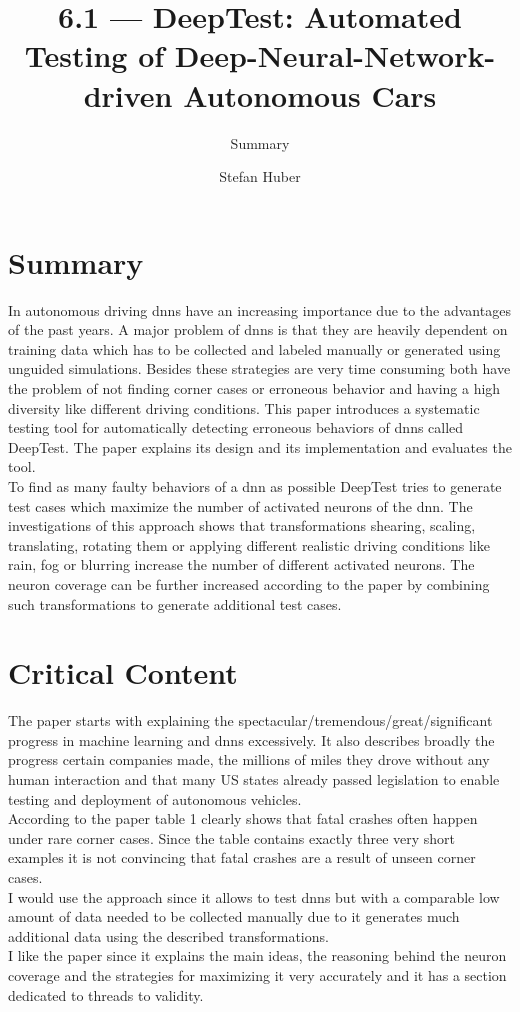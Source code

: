\documentclass[oneside, notitlepage, twocolumn]{scrartcl}
\title{\LARGE 6.1 --- DeepTest: Automated Testing of Deep-Neural-Network-driven Autonomous Cars}
\subtitle{Summary}
\author{Stefan Huber}
\begin{document}
\maketitle

\section{Summary}
In autonomous driving \glspl{dnn} have an increasing importance due to the advantages of the past years.
A major problem of \glspl{dnn} is that they are heavily dependent on training data which has to be collected and labeled manually or generated using unguided simulations.
Besides these strategies are very time consuming both have the problem of not finding corner cases or erroneous behavior and having a high diversity like different driving conditions.
This paper introduces a systematic testing tool for automatically detecting erroneous behaviors of \glspl{dnn} called DeepTest.
The paper explains its design and its implementation and evaluates the tool.\\
To find as many faulty behaviors of a \gls{dnn} as possible DeepTest tries to generate test cases which maximize the number of activated neurons of the \gls{dnn}.
The investigations of this approach shows that transformations shearing, scaling, translating, rotating them or applying different realistic driving conditions like rain, fog or blurring increase the number of different activated neurons.
The neuron coverage can be further increased according to the paper by combining such transformations to generate additional test cases.

\section{Critical Content}
The paper starts with explaining the spectacular/tremendous/great/significant progress in machine learning and \glspl{dnn} excessively.
It also describes broadly the progress certain companies made, the millions of miles they drove without any human interaction and that many US states already passed legislation to enable testing and deployment of autonomous vehicles.\\
According to the paper table 1 clearly shows that fatal crashes often happen under rare corner cases.
Since the table contains exactly three very short examples it is not convincing that fatal crashes are a result of unseen corner cases.\\
I would use the approach since it allows to test \glspl{dnn} but with a comparable low amount of data needed to be collected manually due to it generates much additional data using the described transformations.\\
I like the paper since it explains the main ideas, the reasoning behind the neuron coverage and the strategies for maximizing it very accurately and it has a section dedicated to threads to validity.
\end{document}
